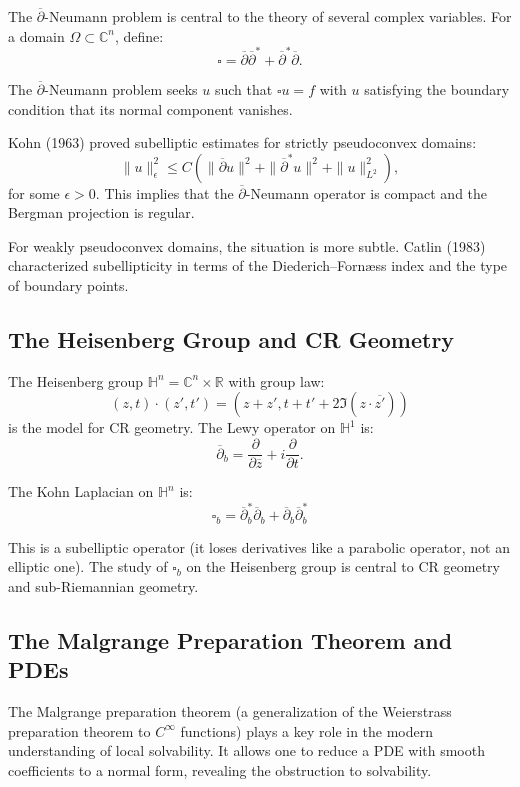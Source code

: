 The $\overline{\partial}$-Neumann problem is central to the theory of several complex variables. For a domain $\Omega \subset \mathbb{C}^n$, define:
\[
\square = \overline{\partial} \overline{\partial}^* + \overline{\partial}^* \overline{\partial}.
\]

The $\overline{\partial}$-Neumann problem seeks $u$ such that $\square u = f$ with $u$ satisfying the boundary condition that its normal component vanishes.

Kohn (1963) proved subelliptic estimates for strictly pseudoconvex domains:
\[
\|u\|^2_\epsilon \leq C(\|\overline{\partial} u\|^2 + \|\overline{\partial}^* u\|^2 + \|u\|^2_{L^2}),
\]
for some $\epsilon > 0$. This implies that the $\overline{\partial}$-Neumann operator is compact and the Bergman projection is regular.

For weakly pseudoconvex domains, the situation is more subtle. Catlin (1983) characterized subellipticity in terms of the Diederich--Forn\ae ss index and the type of boundary points.

\subsection{The Heisenberg Group and CR Geometry}

The Heisenberg group $\mathbb{H}^n = \mathbb{C}^n \times \mathbb{R}$ with group law:
\[
(z, t) \cdot (z', t') = (z + z', t + t' + 2 \Im(z \cdot \overline{z'}))
\]
is the model for CR geometry. The Lewy operator on $\mathbb{H}^1$ is:
\[
\overline{\partial}_b = \frac{\partial}{\partial \overline{z}} + i \frac{\partial}{\partial t}.
\]

The Kohn Laplacian on $\mathbb{H}^n$ is:
\[
\square_b = \overline{\partial}_b^* \overline{\partial}_b + \overline{\partial}_b \overline{\partial}_b^*
\]

This is a subelliptic operator (it loses derivatives like a parabolic operator, not an elliptic one). The study of $\square_b$ on the Heisenberg group is central to CR geometry and sub-Riemannian geometry.

\subsection{The Malgrange Preparation Theorem and PDEs}

The Malgrange preparation theorem (a generalization of the Weierstrass preparation theorem to $C^\infty$ functions) plays a key role in the modern understanding of local solvability. It allows one to reduce a PDE with smooth coefficients to a normal form, revealing the obstruction to solvability.

